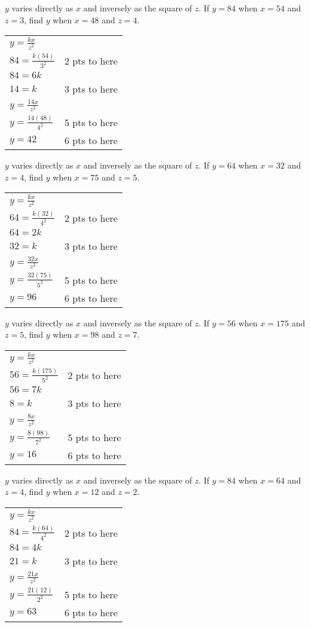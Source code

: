 {
	$y$ varies directly as $x$ and inversely as the square of $z$. If $y=84$ when $x=54$ and $z=3$, find $y$ when $x=48$ and $z=4$.
}
{
	\begin{tabular}{l r}
	$y=\frac{kx}{z^2}$ & \\
	$84=\frac{k(54)}{3^2}$ & 2 pts to here\\
	$84=6k$ & \\
	$14=k$ & 3 pts to here\\
	$y=\frac{14x}{z^2}$ &\\
	$y=\frac{14(48)}{4^2}$& 5 pts to here\\
	$y=42$ & 6 pts to here
	\end{tabular}
}

{
	$y$ varies directly as $x$ and inversely as the square of $z$. If $y=64$ when $x=32$ and $z=4$, find $y$ when $x=75$ and $z=5$.
}
{
	\begin{tabular}{l r}
	$y=\frac{kx}{z^2}$ & \\
	$64=\frac{k(32)}{4^2}$ & 2 pts to here\\
	$64=2k$ & \\
	$32=k$ & 3 pts to here\\
	$y=\frac{32x}{z^2}$ &\\
	$y=\frac{32(75)}{5^2}$& 5 pts to here\\
	$y=96$ & 6 pts to here
	\end{tabular}
}

{
	$y$ varies directly as $x$ and inversely as the square of $z$. If $y=56$ when $x=175$ and $z=5$, find $y$ when $x=98$ and $z=7$.
}
{
	\begin{tabular}{l r}
	$y=\frac{kx}{z^2}$ & \\
	$56=\frac{k(175)}{5^2}$ & 2 pts to here\\
	$56=7k$ & \\
	$8=k$ & 3 pts to here\\
	$y=\frac{8x}{z^2}$ &\\
	$y=\frac{8(98)}{7^2}$& 5 pts to here\\
	$y=16$ & 6 pts to here
	\end{tabular}
}

{
	$y$ varies directly as $x$ and inversely as the square of $z$. If $y=84$ when $x=64$ and $z=4$, find $y$ when $x=12$ and $z=2$.
}
{
	\begin{tabular}{l r}
	$y=\frac{kx}{z^2}$ & \\
	$84=\frac{k(64)}{4^2}$ & 2 pts to here\\
	$84=4k$ & \\
	$21=k$ & 3 pts to here\\
	$y=\frac{21x}{z^2}$ &\\
	$y=\frac{21(12)}{2^2}$& 5 pts to here\\
	$y=63$ & 6 pts to here
	\end{tabular}
}
